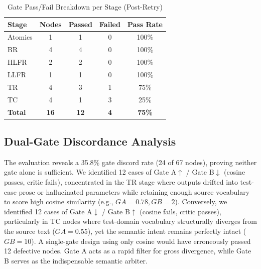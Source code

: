 \documentclass[journal]{IEEEtran}
\begin{document}
\begin{table}[ht]
\centering
\caption{Gate Pass/Fail Breakdown per Stage (Post-Retry)}
\label{tab:passfail}
\begin{tabular}{@{}lcccc@{}}
\toprule
\textbf{Stage} & \textbf{Nodes} & \textbf{Passed} & \textbf{Failed} & \textbf{Pass Rate} \\ \midrule
Atomics & 1 & 1 & 0 & 100\% \\
BR & 4 & 4 & 0 & 100\% \\
HLFR & 2 & 2 & 0 & 100\% \\
LLFR & 1 & 1 & 0 & 100\% \\
TR & 4 & 3 & 1 & 75\% \\
TC & 4 & 1 & 3 & 25\% \\ \midrule
\textbf{Total} & \textbf{16} & \textbf{12} & \textbf{4} & \textbf{75\%} \\
\bottomrule
\end{tabular}
\end{table}

\subsection{Dual-Gate Discordance Analysis}
The evaluation reveals a 35.8\% gate discord rate (24 of 67 nodes), proving neither gate alone is sufficient. We identified 12 cases of Gate A$\uparrow$ / Gate B$\downarrow$ (cosine passes, critic fails), concentrated in the TR stage where outputs drifted into test-case prose or hallucinated parameters while retaining enough source vocabulary to score high cosine similarity (e.g., $GA=0.78, GB=2$). Conversely, we identified 12 cases of Gate A$\downarrow$ / Gate B$\uparrow$ (cosine fails, critic passes), particularly in TC nodes where test-domain vocabulary structurally diverges from the source text ($GA=0.55$), yet the semantic intent remains perfectly intact ($GB=10$). A single-gate design using only cosine would have erroneously passed 12 defective nodes. Gate A acts as a rapid filter for gross divergence, while Gate B serves as the indispensable semantic arbiter.
\end{document}
